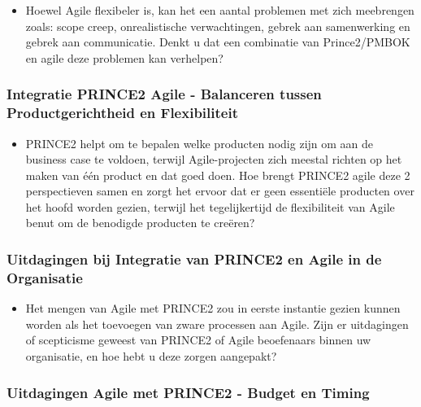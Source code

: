 \documentclass[dutch]{hogent-article}
\begin{document}
\begin{itemize}
    \item Hoewel Agile flexibeler is, kan het een aantal  problemen met zich meebrengen zoals: scope creep, onrealistische verwachtingen, gebrek aan samenwerking en gebrek aan communicatie. Denkt u dat een combinatie van Prince2/PMBOK en agile deze problemen kan verhelpen?
\end{itemize}

\subsubsection{Integratie PRINCE2 Agile - Balanceren tussen Productgerichtheid en Flexibiliteit}
\label{ssec:Integratie PRINCE2 Agile - Balanceren tussen Productgerichtheid en Flexibiliteit}

\begin{itemize}
    \item PRINCE2 helpt om te bepalen welke producten nodig zijn om aan de business case te voldoen, terwijl Agile-projecten zich meestal richten op het maken van één product en dat goed doen. Hoe brengt PRINCE2 agile deze 2 perspectieven samen en zorgt het ervoor dat er geen essentiële producten over het hoofd worden gezien, terwijl het tegelijkertijd de flexibiliteit van Agile benut om de benodigde producten te creëren?
\end{itemize}

\subsubsection{Uitdagingen bij Integratie van PRINCE2 en Agile in de Organisatie}
\label{ssec:Uitdagingen en Overwinningen bij Integratie van PRINCE2 en Agile in de Organisatie}

\begin{itemize}
    \item Het mengen van Agile met PRINCE2 zou in eerste instantie gezien kunnen worden als het toevoegen van zware processen aan Agile. Zijn er uitdagingen of scepticisme geweest van PRINCE2 of Agile beoefenaars binnen uw organisatie, en hoe hebt u deze zorgen aangepakt?
\end{itemize}

\subsubsection{Uitdagingen Agile met PRINCE2 - Budget en Timing}
\label{ssec:Uitdagingen Agile met PRINCE2 - Budget en Timing}
\end{document}
